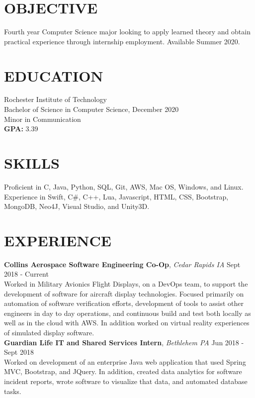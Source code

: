 \documentclass[line, resmargin]{res}
\begin{document}
\address{(484) 554-8487\\ emp9173@rit.edu}

\begin{resume}
\vspace{-7.5mm} %

\section{OBJECTIVE}
Fourth year Computer Science major looking to apply learned theory and obtain practical experience through internship employment. Available Summer 2020.

\section{EDUCATION} 
 Rochester Institute of Technology \\
 Bachelor of Science in Computer Science, December 2020\\
 Minor in Communication\\
 \textbf{GPA:} 3.39
 
\section{SKILLS}
Proficient in C, Java, Python, SQL, Git, AWS, Mac OS, Windows, and Linux. \\
Experience in Swift, C\#, C++, Lua, Javascript, HTML, CSS, Bootstrap, MongoDB, Neo4J, Visual Studio, and Unity3D.
 
 
\section{EXPERIENCE} 
\textbf{Collins Aerospace Software Engineering Co-Op}, \textit{Cedar Rapids IA} \hfill Sept 2018 - Current \\
Worked in Military Avionics Flight Displays, on a DevOps team, to support the development of software for aircraft display technologies.  Focused primarily on automation of software verification efforts, development of tools to assist other engineers in day to day operations, and continuous build and test both locally as well as in the cloud with AWS.  In addition worked on virtual reality experiences of simulated display software.\\ [10pt]
\textbf{Guardian Life IT and Shared Services Intern}, \textit{Bethlehem PA} \hfill Jun 2018 - Sept 2018 \\
Worked on development of an enterprise Java web application that used Spring MVC, Bootstrap, and JQuery.  In addition, created
data analytics for software incident reports, wrote software to visualize that data, and automated database tasks. \\
\vspace{-5.5mm}



\end{resume}
\end{document}
